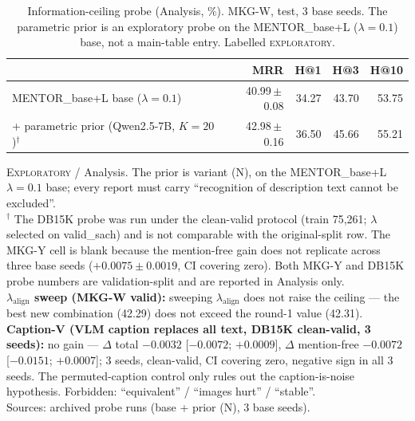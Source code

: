 \begin{table}[t]
\centering
\footnotesize
\setlength{\tabcolsep}{4pt}
\caption{Information-ceiling probe (Analysis, \%). MKG-W, test, 3 base seeds. The parametric prior is an exploratory probe on the MENTOR\_base+L ($\lambda{=}0.1$) base, not a main-table entry. Labelled \textsc{exploratory}.}
\label{tab:ceiling}
\begin{tabular}{l r r r r}
\toprule
 & MRR & H@1 & H@3 & H@10 \\
\midrule
MENTOR\_base+L base ($\lambda{=}0.1$) & 40.99\,$\pm$\,0.08 & 34.27 & 43.70 & 53.75 \\
\;+ parametric prior (Qwen2.5-7B, $K{=}20$)$^\dagger$ & 42.98\,$\pm$\,0.16 & 36.50 & 45.66 & 55.21 \\
\bottomrule
\end{tabular}

\vspace{2pt}
\begin{minipage}{\linewidth}\footnotesize\raggedright
\textsc{Exploratory} / Analysis. The prior is variant (N), on the MENTOR\_base+L $\lambda{=}0.1$ base; every report must carry ``recognition of description text cannot be excluded''. \\
$^\dagger$ The DB15K probe was run under the clean-valid protocol (train 75,261; $\lambda$ selected on valid\_sach) and is not comparable with the original-split row. The MKG-Y cell is blank because the mention-free gain does not replicate across three base seeds ($+0.0075 \pm 0.0019$, CI covering zero). Both MKG-Y and DB15K probe numbers are validation-split and are reported in Analysis only. \\
\textbf{$\lambda_{\text{align}}$ sweep (MKG-W valid):} sweeping $\lambda_{\text{align}}$ does not raise the ceiling --- the best new combination (42.29) does not exceed the round-1 value (42.31). \\
\textbf{Caption-V (VLM caption replaces all text, DB15K clean-valid, 3 seeds):} no gain --- $\Delta$ total $-0.0032$ [$-0.0072$; $+0.0009$], $\Delta$ mention-free $-0.0072$ [$-0.0151$; $+0.0007$]; 3 seeds, clean-valid, CI covering zero, negative sign in all 3 seeds. The permuted-caption control only rules out the caption-is-noise hypothesis. Forbidden: ``equivalent'' / ``images hurt'' / ``stable''. \\
Sources: archived probe runs (base + prior (N), 3 base seeds). \\
\end{minipage}
\end{table}
